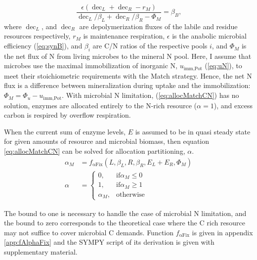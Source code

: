 \begin{equation} 
\label{eq:allocMatchCN}
\frac{\epsilon (\operatorname{dec}_L + \operatorname{dec}_R - r_M)}{
\operatorname{dec}_L/\beta_L + \operatorname{dec}_R/\beta_R  - \Phi_M } =
\beta_B
\text{,}
\end{equation}
where $\operatorname{dec}_L$, and $\operatorname{dec}_R$ are depolymerization
fluxes of the labile and residue resources respectively, $r_M$ is maintenance
respiration, $\epsilon$ is the anabolic microbial efficiency (\ref{eq:synB}),
and $\beta_i$ are C/N ratios of the respective pools $i$, and $\Phi_M$ is the
net flux of N from living microbes to the mineral N pool.
Here, I assume that microbes use the maximal immobilization of inorganic N,
$u_{\operatorname{imm,Pot}}$ (\ref{eq:uN}), to meet their stoichiometric
requirements with the Match strategy. Hence, the net N flux is a difference
between mineralization during uptake and the immobilization: $\Phi_M = \Phi_u -
u_{\operatorname{imm,Pot}}$. With microbial N limitation,
(\ref{eq:allocMatchCN})  has no solution, enzymes are allocated entirely to
the N-rich resource ($\alpha=1$), and excess carbon is
respired by overflow respiration.

When the current sum of enzyme levels, $E$ is assumed to be in quasi
steady state for given amounts of resource and microbial biomass, then equation
\ref{eq:allocMatchCN} can be solved for allocation partitioning, $\alpha$.
\begin{subequations}
\label{eq:allocMatch} 
\begin{align}
\alpha_M &= f_{\operatorname{{\alpha}Fix}}(L,\beta_L,R,\beta_R, E_L + E_R,
\Phi_M)
\\
\alpha &= \begin{cases}
  0,  & \text{if} \alpha_M \le 0 \\
  1,  & \text{if} \alpha_M \ge 1 \\
  \alpha_M, & \text{otherwise}
\end{cases}   
\end{align}
\end{subequations} 

\noindent
The bound to one is necessary to handle the case of microbial N
limitation, and the bound to zero corresponds to the theoretical case where the
C rich resource may not suffice to cover microbial C demands. 
Function $f_{\operatorname{{\alpha}Fix}}$ is given in appendix
\ref{app:fAlphaFix} and the SYMPY script of its 
derivation is given with supplementary material. 

